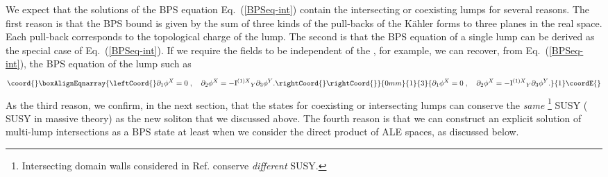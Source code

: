 \documentclass[a4paper,12pt]{article}
\providecommand{\kahler}{K\"{a}hler }
\begin{document}
We expect that the solutions of the BPS equation Eq.~(\ref{BPSeq-int}) 
contain the intersecting or coexisting lumps for several reasons. 
The first reason is 
that the BPS bound is given by the sum of three kinds of the 
pull-backs of the \kahler forms to three planes in the real space. 
Each pull-back corresponds to the topological charge of the lump. 
The second is that the BPS equation of a single lump can be derived as 
the special case of Eq.~(\ref{BPSeq-int}).
If we require the fields to be independent of the \coordHE{}, for example, 
we can recover, from Eq.~(\ref{BPSeq-int}), the BPS equation of the 
lump such as 
\begin{eqnarray}\coord{}\boxAlignEqnarray{\leftCoord{}
  \partial_1\phi^X=0\;,\quad 
  \partial_2\phi^X= - {{\rm I}^{(1)X}}_Y\partial_3\phi^Y.\rightCoord{}
\rightCoord{}}{0mm}{1}{3}{
  \partial_1\phi^X=0\;,\quad 
  \partial_2\phi^X= - {{\rm I}^{(1)X}}_Y\partial_3\phi^Y.
}{1}\coordE{}\end{eqnarray}
As the third reason, we confirm, in the next section, that the states 
for coexisting or intersecting lumps can conserve the {\it same}
\footnote{
Intersecting domain walls considered in Ref.\cite{Townsend1} conserve 
{\it different} \coordHE{} SUSY.
} 
 \coordHE{} SUSY (\coordHE{} SUSY in massive theory) as the new soliton 
 that we discussed above.
The fourth reason is that 
we can construct an explicit solution of 
multi-lump intersections as a \coordHE{} BPS state
at least when we consider the direct product of ALE spaces, 
as discussed below.

\end{document}
